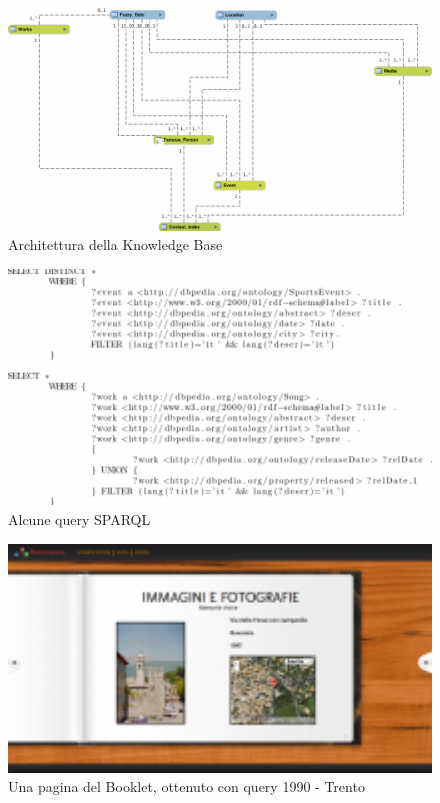 \documentclass{acm_proc_article-sp}
\begin{document}


\begin{figure}[t]
\centering
\includegraphics[width=1.0\textwidth]{model.pdf}
\caption{Architettura della Knowledge Base}
\label{fig:model}
\end{figure}

\begin{figure}[t]
\centering
\includegraphics[width=1.0\textwidth]{sparql.pdf}
\caption{Alcune query SPARQL}
\label{fig:sparql}
\end{figure}

\begin{figure}[t]
\centering
\includegraphics[width=1.0\textwidth]{booklet.pdf}
\caption{Una pagina del Booklet, ottenuto con query 1990 - Trento}
\label{fig:booklet}
\end{figure}
\end{document}
